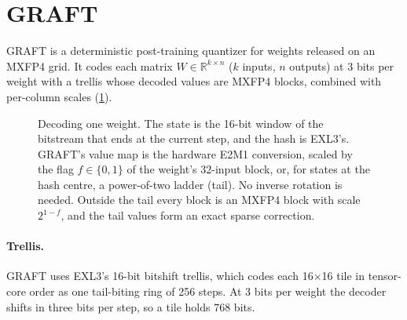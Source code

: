 \section{GRAFT}
\label{sec:method}

GRAFT is a deterministic post-training quantizer for weights released on an MXFP4 grid. It codes each matrix
$W\in\mathbb{R}^{k\times n}$ ($k$ inputs, $n$ outputs) at 3 bits per weight with a trellis whose decoded values are
MXFP4 blocks, combined with per-column scales (\cref{fig:pipeline}).

\begin{figure}[b!]
\centering
{}
\caption{Decoding one weight. The state is the 16-bit window of the bitstream that ends at the current step, and the
hash is EXL3's. GRAFT's value map is the hardware E2M1 conversion, scaled by the flag $f\in\{0,1\}$ of the weight's
32-input block, or, for states at the hash centre, a power-of-two ladder (tail). No inverse rotation is needed.
Outside the tail every block is an MXFP4 block with scale $2^{1-f}$, and the tail values form an exact sparse
correction.}
\label{fig:pipeline}
\end{figure}

\paragraph{Trellis.} GRAFT uses EXL3's 16-bit bitshift trellis, which codes each 16$\times$16 tile in tensor-core
order as one tail-biting ring of 256 steps. At 3 bits per weight the decoder shifts in three bits per step, so a tile
holds 768 bits.

